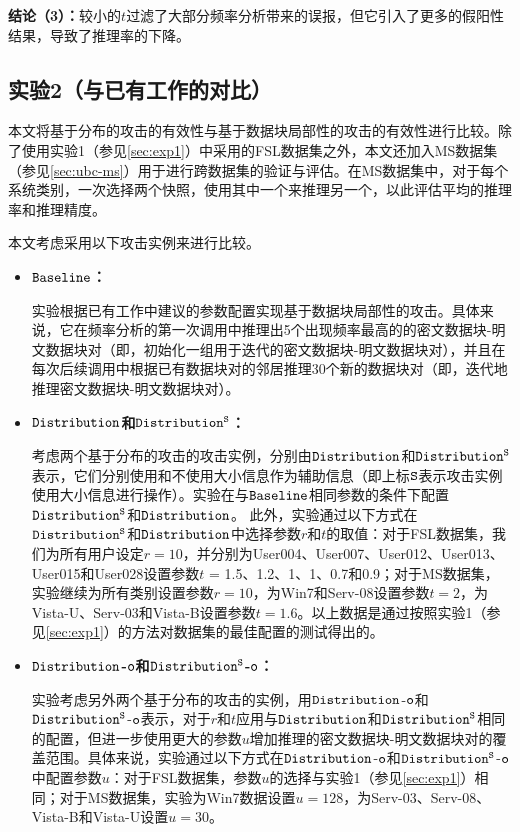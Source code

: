 \textbf{结论（3）：}较小的$t$过滤了大部分频率分析带来的误报，但它引入了更多的假阳性结果，导致了推理率的下降。

\subsection{实验2（与已有工作的对比）}
\label{sec:exp2}
本文将基于分布的攻击的有效性与基于数据块局部性的攻击的有效性进行比较。除了使用实验1（参见\ref{sec:exp1}）中采用的FSL数据集之外，本文还加入MS数据集（参见\ref{sec:ubc-ms}）用于进行跨数据集的验证与评估。在MS数据集中，对于每个系统类别，一次选择两个快照，使用其中一个来推理另一个，以此评估平均的推理率和推理精度。

本文考虑采用以下攻击实例来进行比较。

\begin{itemize}[leftmargin=*]
\item \textbf{$\tt Baseline$：}

实验根据已有工作中建议的参数配置实现基于数据块局部性的攻击。具体来说，它在频率分析的第一次调用中推理出5个出现频率最高的的密文数据块-明文数据块对（即，初始化一组用于迭代的密文数据块-明文数据块对），并且在每次后续调用中根据已有数据块对的邻居推理30个新的数据块对（即，迭代地推理密文数据块-明文数据块对）。

\item \textbf{$\tt Distribution$和$\tt Distribution^S$：} 

考虑两个基于分布的攻击的攻击实例，分别由$\tt Distribution$和$\tt Distribution^S$表示，它们分别使用和不使用大小信息作为辅助信息（即上标$\tt S$表示攻击实例使用大小信息进行操作）。实验在与${\tt Baseline}$相同参数的条件下配置$\tt Distribution^S$和${\tt Distribution}$。 此外，实验通过以下方式在$\tt Distribution^S$和${\tt Distribution}$中选择参数$r$和$t$的取值：对于FSL数据集，我们为所有用户设定$r = 10$，并分别为User004、User007、User012、User013、User015和User028设置参数$t$ = 1.5、1.2、1、1、0.7和0.9；对于MS数据集，实验继续为所有类别设置参数$r = 10$，为Win7和Serv-08设置参数$t = 2$，为Vista-U、Serv-03和Vista-B设置参数$t = 1.6$。以上数据是通过按照实验1（参见\ref{sec:exp1}）的方法对数据集的最佳配置的测试得出的。 
\item \textbf{$\tt Distribution$-$\tt o$和$\tt Distribution^S$-$\tt o$：}

实验考虑另外两个基于分布的攻击的实例，用$\tt Distribution$-$\tt o$和$\tt Distribution^S$-$\tt o$表示，对于$r$和$t$应用与$\tt Distribution$和$\tt Distribution^S$相同的配置，但进一步使用更大的参数$u$增加推理的密文数据块-明文数据块对的覆盖范围。具体来说，实验通过以下方式在$\tt Distribution$-$\tt o$和$\tt Distribution^S$-$\tt o$中配置参数$u$：对于FSL数据集，参数$u$的选择与实验1（参见\ref{sec:exp1}）相同；对于MS数据集，实验为Win7数据设置$u = 128$，为Serv-03、Serv-08、Vista-B和Vista-U设置$u  = 30$。 
\end{itemize}

